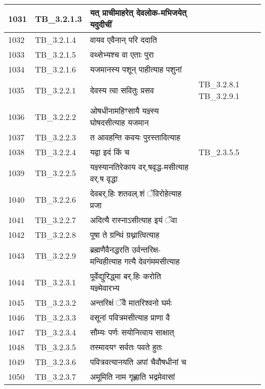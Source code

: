 \documentclass[17pt]{extarticle}
\begin{document}
\begin{longtable}{||p{0.4in}||p{0.9in}||p{4.0in}||p{0.9in}||}
            1031 & TB\_3.2.1.3 & यत् प्राचीमाहरेत् देवलोक{-}मभिजयेत् यदुदीचीं &      \\
        \hline
            1032 & TB\_3.2.1.4 & वायव एवैनान् परि ददाति &      \\
        \hline
            1033 & TB\_3.2.1.5 & वथ्सेभ्यश्च वा एताः पुरा &      \\
        \hline
            1034 & TB\_3.2.1.6 & यजमानस्य पशून् पाहीत्याह पशुनां &      \\
        \hline
            1035 & TB\_3.2.2.1 & देवस्य त्वा सवितुः प्रसव &  TB\_3.2.8.1 TB\_3.2.9.1       \\
        \hline
            1036 & TB\_3.2.2.2 & ओषधीनामहिꣳसायै यज्ञ्स्य घोषदसीत्याह यजमान &      \\
        \hline
            1037 & TB\_3.2.2.3 & त आवहन्ति कवयः पुरस्तादित्याह &      \\
        \hline
            1038 & TB\_3.2.2.4 & यद्वा इदं किं च & TB\_2.3.5.5        \\
        \hline
            1039 & TB\_3.2.2.5 & यज्ञ्स्यानतिरेकाय वर्.षवृद्ध{-}मसीत्याह वर्.ष वृद्धा &      \\
        \hline
            1040 & TB\_3.2.2.6 & देवबर्.हिः शतवल्.शं ॅविरोहेत्याह प्रजा &      \\
        \hline
            1041 & TB\_3.2.2.7 & अदित्यै रास्नाऽसीत्याह इयं ॅवा &      \\
        \hline
            1042 & TB\_3.2.2.8 & पूषा ते ग्रन्थिं ग्रथ्नात्वित्याह &      \\
        \hline
            1043 & TB\_3.2.2.9 & ब्रह्मणैवैनद्धरति उर्वन्तरिक्ष{-}मन्विहीत्याह गत्यै देवगंममसीत्याह &      \\
        \hline
            1044 & TB\_3.2.3.1 & पूर्वेद्युरिद्ध्मा बर्.हिः करोति यज्ञ्मेवारभ्य &      \\
        \hline
            1045 & TB\_3.2.3.2 & अन्तरिक्षं ॅवै मातरिश्वनो घर्मः &      \\
        \hline
            1046 & TB\_3.2.3.3 & वसूनां पवित्रमसीत्याह प्राणा वै &      \\
        \hline
            1047 & TB\_3.2.3.4 & सौम्यः पर्णः सयोनित्वाय साक्षात् &      \\
        \hline
            1048 & TB\_3.2.3.5 & तस्मादयꣳ सर्वतः पवते हुतः &      \\
        \hline
            1049 & TB\_3.2.3.6 & पवित्रवत्यानयति अपां चैवौषधीनां च &      \\
        \hline
            1050 & TB\_3.2.3.7 & अमूमिति नाम गृह्णाति भद्रमेवासां &      \\

\end{longtable}
\end{document}
